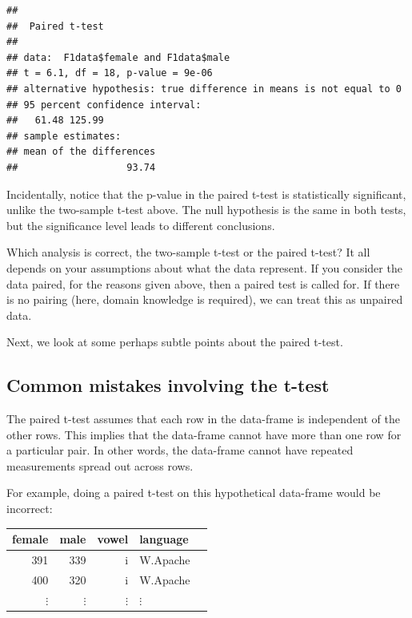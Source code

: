 \documentclass[12pt,]{krantz}
\newenvironment{Shaded}{\begin{snugshade}}{\end{snugshade}}
\newcommand{\DataTypeTok}[1]{\textcolor[rgb]{0.13,0.29,0.53}{#1}}
\newcommand{\KeywordTok}[1]{\textcolor[rgb]{0.13,0.29,0.53}{\textbf{#1}}}
\newcommand{\NormalTok}[1]{#1}
\newcommand{\OperatorTok}[1]{\textcolor[rgb]{0.81,0.36,0.00}{\textbf{#1}}}
\newcommand{\OtherTok}[1]{\textcolor[rgb]{0.56,0.35,0.01}{#1}}
\begin{document}
\begin{Shaded}
\end{Shaded}

\begin{verbatim}
## 
## 	Paired t-test
## 
## data:  F1data$female and F1data$male
## t = 6.1, df = 18, p-value = 9e-06
## alternative hypothesis: true difference in means is not equal to 0
## 95 percent confidence interval:
##   61.48 125.99
## sample estimates:
## mean of the differences 
##                   93.74
\end{verbatim}

Incidentally, notice that the p-value in the paired t-test is statistically significant, unlike the two-sample t-test above. The null hypothesis is the same in both tests, but the significance level leads to different conclusions.

Which analysis is correct, the two-sample t-test or the paired t-test? It all depends on your assumptions about what the data represent. If you consider the data paired, for the reasons given above, then a paired test is called for. If there is no pairing (here, domain knowledge is required), we can treat this as unpaired data.

Next, we look at some perhaps subtle points about the paired t-test.

\hypertarget{common-mistakes-involving-the-t-test}{%
\subsection{Common mistakes involving the t-test}\label{common-mistakes-involving-the-t-test}}

The paired t-test assumes that each row in the data-frame is independent of the other rows. This implies that the data-frame cannot have more than one row for a particular pair. In other words, the data-frame cannot have repeated measurements spread out across rows.

For example, doing a paired t-test on this hypothetical data-frame would be incorrect:

\begin{table}[ht]
\centering
\begin{tabular}{rrrll}
\hline
female & male & vowel & language \\ 
\hline
391 & 339 & i & W.Apache \\ 
400 & 320 & i & W.Apache \\ 
$\vdots$ & $\vdots$ & $\vdots$ & $\vdots$\\
\hline
\end{tabular}
\end{table}
\end{document}
